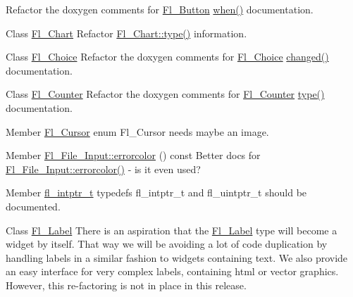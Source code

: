 \begin{DoxyRefList}
\label{todo__todo000009}%
%
Refactor the doxygen comments for \mbox{\hyperlink{class_fl___button}{Fl\+\_\+\+Button}} \mbox{\hyperlink{class_fl___widget_ad4ef380ffb50f4d00fe93f7b6677e9e1}{when()}} documentation. 
\item[Class \mbox{\hyperlink{class_fl___chart}{Fl\+\_\+\+Chart}} ]\label{todo__todo000010}%
%
Refactor \mbox{\hyperlink{class_fl___widget_adda2e8f162b3ea0332eb8d762350bbd5}{Fl\+\_\+\+Chart\+::type()}} information. 
\item[Class \mbox{\hyperlink{class_fl___choice}{Fl\+\_\+\+Choice}} ]\label{todo__todo000011}%
%
Refactor the doxygen comments for \mbox{\hyperlink{class_fl___choice}{Fl\+\_\+\+Choice}} \mbox{\hyperlink{class_fl___widget_af007a3c83ac176a7511df8df0706947c}{changed()}} documentation. 
\item[Class \mbox{\hyperlink{class_fl___counter}{Fl\+\_\+\+Counter}} ]\label{todo__todo000012}%
%
Refactor the doxygen comments for \mbox{\hyperlink{class_fl___counter}{Fl\+\_\+\+Counter}} \mbox{\hyperlink{class_fl___widget_adda2e8f162b3ea0332eb8d762350bbd5}{type()}} documentation. 
\item[Member \mbox{\hyperlink{_enumerations_8_h_a72bde974edc7926b1217dd51b8c7e8e0}{Fl\+\_\+\+Cursor}} ]\label{todo__todo000005}%
%
enum Fl\+\_\+\+Cursor needs maybe an image.  
\item[Member \mbox{\hyperlink{class_fl___file___input_a7e5f2f3b29dccd1ecee9426c07cd5df1}{Fl\+\_\+\+File\+\_\+\+Input::errorcolor}} () const]\label{todo__todo000016}%
%
Better docs for \mbox{\hyperlink{class_fl___file___input_a7e5f2f3b29dccd1ecee9426c07cd5df1}{Fl\+\_\+\+File\+\_\+\+Input\+::errorcolor()}} -\/ is it even used?  
\item[Member \mbox{\hyperlink{_fl___widget_8_h_a6c7d27e81f16857f18da5e4ce097de75}{fl\+\_\+intptr\+\_\+t}} ]\label{todo__todo000020}%
%
typedef\textquotesingle{}s fl\+\_\+intptr\+\_\+t and fl\+\_\+uintptr\+\_\+t should be documented.  
\item[Class \mbox{\hyperlink{struct_fl___label}{Fl\+\_\+\+Label}} ]\label{todo__todo000021}%
%
There is an aspiration that the \mbox{\hyperlink{struct_fl___label}{Fl\+\_\+\+Label}} type will become a widget by itself. That way we will be avoiding a lot of code duplication by handling labels in a similar fashion to widgets containing text. We also provide an easy interface for very complex labels, containing html or vector graphics. However, this re-\/factoring is not in place in this release.  

\end{DoxyRefList}
